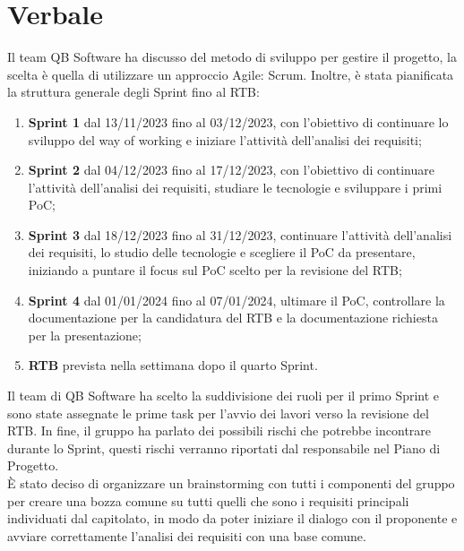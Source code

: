 \documentclass[12pt]{article}
\begin{document}
    \section{Verbale}
		Il team QB Software ha discusso del metodo di sviluppo per gestire il progetto, la scelta è quella di utilizzare un approccio Agile: Scrum. Inoltre, è stata pianificata la struttura generale degli Sprint fino al RTB:
		\begin{enumerate}
			\item \textbf{Sprint 1} dal 13/11/2023 fino al 03/12/2023, con l'obiettivo di continuare lo sviluppo del way of working e iniziare l'attività dell'analisi dei requisiti; 
			\item \textbf{Sprint 2} dal 04/12/2023 fino al 17/12/2023, con l'obiettivo di continuare l'attività dell'analisi dei requisiti, studiare le tecnologie e sviluppare i primi PoC;
			\item \textbf{Sprint 3} dal 18/12/2023 fino al 31/12/2023, continuare l'attività dell'analisi dei requisiti, lo studio delle tecnologie e scegliere il PoC da presentare, iniziando a puntare il focus sul PoC scelto per la revisione del RTB;
			\item \textbf{Sprint 4} dal 01/01/2024 fino al 07/01/2024, ultimare il PoC, controllare la documentazione per la candidatura del RTB e la documentazione richiesta per la presentazione;
			\item \textbf{RTB} prevista nella settimana dopo il quarto Sprint.
		\end{enumerate}
		\noindent
		Il team di QB Software ha scelto la suddivisione dei ruoli per il primo Sprint e sono state assegnate le prime task per l'avvio dei lavori verso la revisione del RTB. In fine, il gruppo ha parlato dei possibili rischi che potrebbe incontrare durante lo Sprint, questi rischi verranno riportati dal responsabile nel Piano di Progetto.
		\\
		È stato deciso di organizzare un brainstorming con tutti i componenti del gruppo per creare una bozza comune su tutti quelli che sono i requisiti principali individuati dal capitolato, in modo da poter iniziare il dialogo con il proponente e avviare correttamente l'analisi dei requisiti con una base comune.
		
\end{document}
